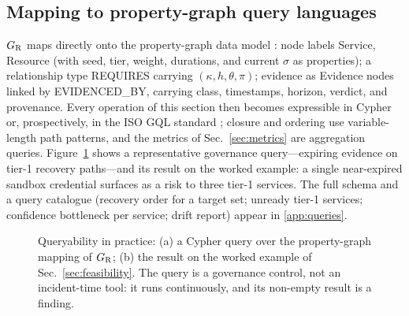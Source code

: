 \subsection{Mapping to property-graph query languages}
\label{sec:mapping}

$G_{\mathrm{R}}$ maps directly onto the property-graph data model \citep{angles2017foundations}: node labels \textsf{Service}, \textsf{Resource} (with \textsf{seed}, \textsf{tier}, weight, durations, and current $\sigma$ as properties); a relationship type \textsf{REQUIRES} carrying $(\kappa, h, \theta, \pi)$; evidence as \textsf{Evidence} nodes linked by \textsf{EVIDENCED\_BY}, carrying class, timestamps, horizon, verdict, and provenance. Every operation of this section then becomes expressible in Cypher \citep{francis2018cypher} or, prospectively, in the ISO GQL standard \citep{iso2024gql}; closure and ordering use variable-length path patterns, and the metrics of Sec.~\ref{sec:metrics} are aggregation queries. Figure~\ref{fig:query} shows a representative governance query---expiring evidence on tier-1 recovery paths---and its result on the worked example: a single near-expired sandbox credential surfaces as a risk to three tier-1 services. The full schema and a query catalogue (recovery order for a target set; unready tier-1 services; confidence bottleneck per service; drift report) appear in \ref{app:queries}.

\begin{figure}[t]
  
  \caption{Queryability in practice: (a) a Cypher query over the property-graph mapping of $G_{\mathrm{R}}$; (b) the result on the worked example of Sec.~\ref{sec:feasibility}. The query is a governance control, not an incident-time tool: it runs continuously, and its non-empty result is a finding.}
  \label{fig:query}
\end{figure}
